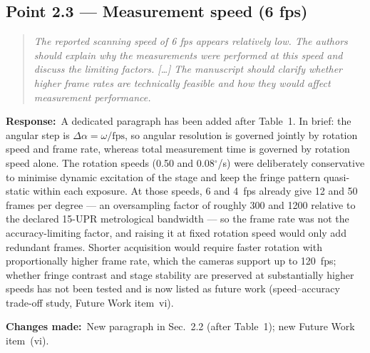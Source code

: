 \documentclass[11pt,a4paper]{article}
\newenvironment{reviewercomment}%
{\par\medskip\noindent\begin{quotation}\itshape\color{black!70}}%
{\end{quotation}\medskip}
\newcommand{\response}{\par\noindent\textbf{Response:}\ }
\newcommand{\changes}{\par\noindent\textbf{Changes made:}\ }
\begin{document}
\subsection*{Point 2.3 --- Measurement speed (6 fps)}
\begin{reviewercomment}
The reported scanning speed of 6 fps appears relatively low. The authors should explain why the measurements were performed at this speed and discuss the limiting factors. [\ldots] The manuscript should clarify whether higher frame rates are technically feasible and how they would affect measurement performance.
\end{reviewercomment}
\response A dedicated paragraph has been added after Table~1. In brief: the angular step is $\Delta\alpha = \omega/\mathrm{fps}$, so angular resolution is governed jointly by rotation speed and frame rate, whereas total measurement time is governed by rotation speed alone. The rotation speeds (0.50 and 0.08$^\circ$/s) were deliberately conservative to minimise dynamic excitation of the stage and keep the fringe pattern quasi-static within each exposure. At those speeds, 6 and 4~fps already give 12 and 50 frames per degree --- an oversampling factor of roughly 300 and 1200 relative to the declared 15-UPR metrological bandwidth --- so the frame rate was not the accuracy-limiting factor, and raising it at fixed rotation speed would only add redundant frames. Shorter acquisition would require faster rotation with proportionally higher frame rate, which the cameras support up to 120~fps; whether fringe contrast and stage stability are preserved at substantially higher speeds has not been tested and is now listed as future work (speed--accuracy trade-off study, Future Work item~vi).
\changes New paragraph in Sec.~2.2 (after Table~1); new Future Work item~(vi).
\end{document}
